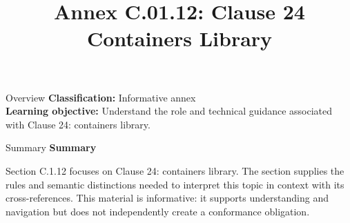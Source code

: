 \documentclass[10pt,letterpaper]{article}
\title{Annex C.01.12: Clause 24 Containers Library}
\author{}
\date{}
\begin{document}
\maketitle
\begin{CornellOverviewBox}{Overview}
\textbf{Classification:} Informative annex\\[2pt]
\textbf{Learning objective:} Understand the role and technical guidance associated with Clause 24: containers library.
\end{CornellOverviewBox}\begin{CornellSummaryBox}{Summary}
{\sffamily\bfseries\color{Accent} Summary}\par\vspace{3pt}Section C.1.12 focuses on Clause 24: containers library. The section supplies the rules and semantic distinctions needed to interpret this topic in context with its cross-references. This material is informative: it supports understanding and navigation but does not independently create a conformance obligation.
\end{CornellSummaryBox}
\end{document}
